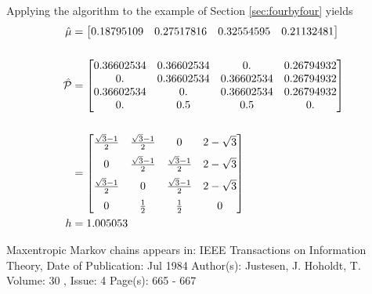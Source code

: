 \documentclass[12pt]{article} \usepackage{amsmath,amsfonts}
\newcommand{\T}{{\cal P}}
\begin{document}
Applying the algorithm to the example of Section \ref{sec:fourbyfour}
yields
\newcommand{\first}{\frac{\sqrt{3}-1}{2}}
\newcommand{\second}{2-\sqrt{3}}
\begin{align*}
  \hat \mu &=
  \begin{bmatrix}
     0.18795109  & 0.27517816 & 0.32554595 & 0.21132481
  \end{bmatrix} \\ \\
  \hat \T &=
  \begin{bmatrix}
 0.36602534 & 0.36602534 & 0. &         0.26794932  \\
  0. &         0.36602534 & 0.36602534 & 0.26794932 \\
  0.36602534 & 0. &         0.36602534 & 0.26794932 \\
  0. &         0.5 &        0.5 &        0.         
  \end{bmatrix} \\ \\
  &=
  \begin{bmatrix}
    \first & \first & 0      & \second \medskip \\
    0      & \first & \first & \second \medskip \\
    \first & 0      & \first & \second \medskip \\
    0      & \frac{1}{2} & \frac{1}{2} & 0
  \end{bmatrix} \\
  h &= 1.005053
\end{align*}

Maxentropic Markov chains appears in:
IEEE Transactions on Information Theory, 
Date of Publication: Jul 1984
Author(s): Justesen, J.
Hoholdt, T.
Volume: 30 , Issue: 4
Page(s): 665 - 667 
\end{document}

